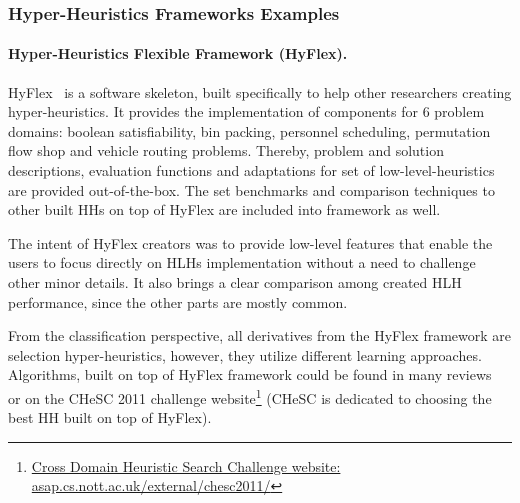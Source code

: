 \subsubsection{Hyper-Heuristics Frameworks Examples}\label{bg: hh fw examples}
\paragraph{Hyper-Heuristics Flexible Framework (HyFlex).} HyFlex~\cite{ochoa2012hyflex} is a software skeleton, built specifically to help other researchers creating hyper-heuristics. It provides the implementation of components for 6 problem domains: boolean satisfiability, bin packing, personnel scheduling, permutation flow shop and vehicle routing problems. Thereby, problem and solution descriptions, evaluation functions and adaptations for set of low-level-heuristics are provided out-of-the-box. The set benchmarks and comparison techniques to other built HHs on top of HyFlex are included into framework as well. 

The intent of HyFlex creators was to provide low-level features that enable the users to focus directly on HLHs implementation without a need to challenge other minor details. It also brings a clear comparison among created HLH performance, since the other parts are mostly common. 

From the classification perspective, all derivatives from the HyFlex framework are selection hyper-heuristics, however, they utilize different learning approaches. Algorithms, built on top of HyFlex framework could be found in many reviews~\cite{misir2012intelligent,ryser2014review,drake2019recent} or on the CHeSC 2011 challenge website\footnote{\href{http://www.asap.cs.nott.ac.uk/external/chesc2011/}{Cross Domain Heuristic Search Challenge website: asap.cs.nott.ac.uk/external/chesc2011/}} (CHeSC is dedicated to choosing the best HH built on top of HyFlex).

